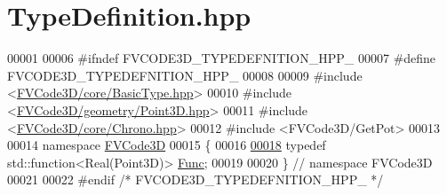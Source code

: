 \hypertarget{TypeDefinition_8hpp_source}{}\section{Type\+Definition.\+hpp}
\label{TypeDefinition_8hpp_source}

\begin{DoxyCode}
00001 
00006 \textcolor{preprocessor}{#ifndef FVCODE3D\_TYPEDEFNITION\_HPP\_}
00007 \textcolor{preprocessor}{#define FVCODE3D\_TYPEDEFNITION\_HPP\_}
00008 
00009 \textcolor{preprocessor}{#include <\hyperlink{BasicType_8hpp}{FVCode3D/core/BasicType.hpp}>}
00010 \textcolor{preprocessor}{#include <\hyperlink{Point3D_8hpp}{FVCode3D/geometry/Point3D.hpp}>}
00011 \textcolor{preprocessor}{#include <\hyperlink{Chrono_8hpp}{FVCode3D/core/Chrono.hpp}>}
00012 \textcolor{preprocessor}{#include <FVCode3D/GetPot>}
00013 
00014 \textcolor{keyword}{namespace }\hyperlink{namespaceFVCode3D}{FVCode3D}
00015 \{
00016 
\hypertarget{TypeDefinition_8hpp_source.tex_l00018}{}\hyperlink{namespaceFVCode3D_a38fa3b2520ad364d2c3d56ea5077826a}{00018} \textcolor{keyword}{typedef} std::function<Real(Point3D)> \hyperlink{namespaceFVCode3D_a38fa3b2520ad364d2c3d56ea5077826a}{Func};
00019 
00020 \} \textcolor{comment}{// namespace FVCode3D}
00021 
00022 \textcolor{preprocessor}{#endif }\textcolor{comment}{/* FVCODE3D\_TYPEDEFNITION\_HPP\_ */}\textcolor{preprocessor}{}
\end{DoxyCode}

